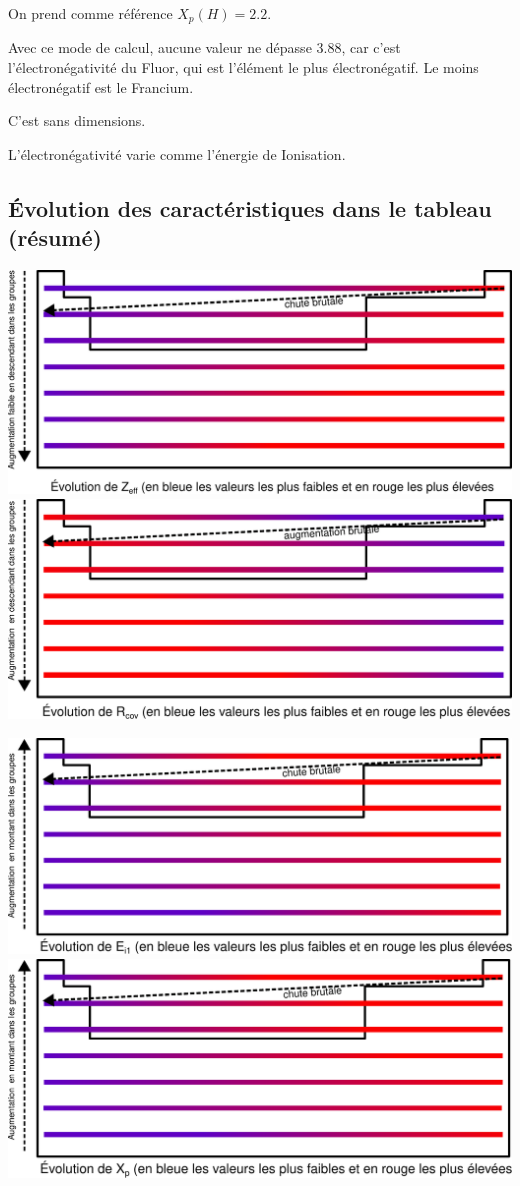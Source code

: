 \documentclass[french]{yLectureNote}
\begin{document}
On prend comme référence $X_p(H) = 2.2$.

Avec ce mode de calcul, aucune valeur ne dépasse 3.88, car c'est l'électronégativité du Fluor, qui est l'élément le plus électronégatif. Le moins électronégatif est le Francium.

C'est sans dimensions.

L'électronégativité varie comme l'énergie de Ionisation.
\subsection{Évolution des caractéristiques dans le tableau (résumé)}
\includegraphics[scale=0.4]{evo_zeff}\includegraphics[scale=0.4]{evo_rcov}

\includegraphics[scale=0.4]{evo_ei1}\includegraphics[scale=0.4]{evo_xp}
\end{document}
